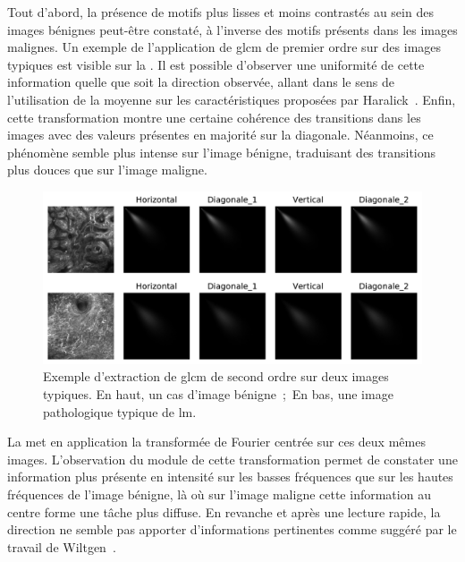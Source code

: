 Tout d'abord, la présence de motifs plus lisses et moins contrastés au sein des images bénignes peut-être constaté, à l'inverse des motifs présents dans les images malignes. Un exemple de l'application de \gls{glcm} de premier ordre sur des images typiques est visible sur la . Il est possible d'observer une uniformité de cette information quelle que soit la direction observée, allant dans le sens de l'utilisation de la moyenne sur les caractéristiques proposées par Haralick~. Enfin, cette transformation montre une certaine cohérence des transitions dans les images avec des valeurs présentes en majorité sur la diagonale. Néanmoins, ce phénomène semble plus intense sur l'image bénigne, traduisant des transitions plus douces que sur l'image maligne.\par

\begin{figure}[H]
    \centering
    \includegraphics[width=\linewidth]{contents/chapter_5/resources/example_glcm.pdf}
    \caption{Exemple d'extraction de \gls{glcm} de second ordre sur deux images typiques. En haut, un cas d'image bénigne~;~En bas, une image pathologique typique de \gls{lm}.}
    \label{fig:example_glcm}
\end{figure}\par

La  met en application la transformée de Fourier centrée sur ces deux mêmes images. L'observation du module de cette transformation permet de constater une information plus présente en intensité sur les basses fréquences que sur les hautes fréquences de l'image bénigne, là où sur l'image maligne cette information au centre forme une tâche plus diffuse. En revanche et après une lecture rapide, la direction ne semble pas apporter d'informations pertinentes comme suggéré par le travail de Wiltgen~.\par

